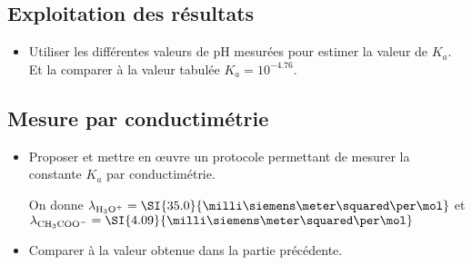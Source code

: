 \documentclass{tp}
\begin{document}
\subsection{Exploitation des résultats}%
\begin{itemize}
  \item Utiliser les différentes valeurs de pH mesurées pour estimer la valeur de $K_a$. Et la comparer à la valeur tabulée $K_a = 10^{\num{-4.76}}$. 

\end{itemize}
\label{sub:exploitation_des_resultats}

\subsection{Mesure par conductimétrie}%
\label{sub:mesure_par_conductimetrie}

\begin{itemize}
  \item Proposer et mettre en œuvre un protocole permettant de mesurer la constante $K_a$ par conductimétrie.

  On donne $\lambda_{\ce{H3O+}}=\SI{35.0}{\milli\siemens\meter\squared\per\mol}$ et $\lambda_{\ce{CH3COO-}}=\SI{4.09}{\milli\siemens\meter\squared\per\mol}$
  \item Comparer à la valeur obtenue dans la partie précédente.
\end{itemize}
\end{document}
